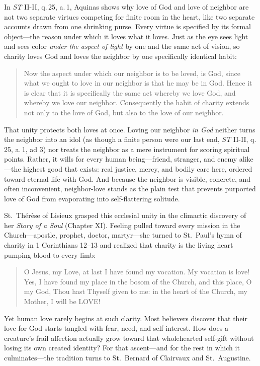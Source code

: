 In \emph{ST} II-II, q.\,25, a.\,1, Aquinas shows why love of God and love of neighbor are not two separate virtues competing for finite room in the heart, like two separate accounts drawn from one shrinking purse. Every virtue is specified by its formal object---the reason under which it loves what it loves. Just as the eye sees light and sees color \emph{under the aspect of light} by one and the same act of vision, so charity loves God and loves the neighbor by one specifically identical habit:

\begin{quote}
Now the aspect under which our neighbor is to be loved, is God, since what we ought to love in our neighbor is that he may be in God. Hence it is clear that it is specifically the same act whereby we love God, and whereby we love our neighbor. Consequently the habit of charity extends not only to the love of God, but also to the love of our neighbor.
\end{quote}

That unity protects both loves at once. Loving our neighbor \emph{in God} neither turns the neighbor into an idol (as though a finite person were our last end, \emph{ST} II-II, q.\,25, a.\,1, ad 3) nor treats the neighbor as a mere instrument for scoring spiritual points. Rather, it wills for every human being---friend, stranger, and enemy alike---the highest good that exists: real justice, mercy, and bodily care here, ordered toward eternal life with God. And because the neighbor is visible, concrete, and often inconvenient, neighbor-love stands as the plain test that prevents purported love of God from evaporating into self-flattering solitude.

St.\ Th\'er\`ese of Lisieux grasped this ecclesial unity in the climactic discovery of her \emph{Story of a Soul} (Chapter XI). Feeling pulled toward every mission in the Church---apostle, prophet, doctor, martyr---she turned to St.\ Paul's hymn of charity in 1 Corinthians 12--13 and realized that charity is the living heart pumping blood to every limb:

\begin{quote}
O Jesus, my Love, at last I have found my vocation. My vocation is love! Yes, I have found my place in the bosom of the Church, and this place, O my God, Thou hast Thyself given to me: in the heart of the Church, my Mother, I will be LOVE!
\end{quote}

Yet human love rarely begins at such clarity. Most believers discover that their love for God starts tangled with fear, need, and self-interest. How does a creature's frail affection actually grow toward that wholehearted self-gift without losing its own created identity? For that ascent---and for the rest in which it culminates---the tradition turns to St.\ Bernard of Clairvaux and St.\ Augustine.
